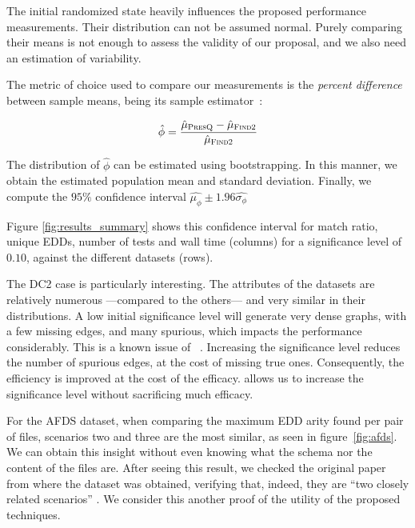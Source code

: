 The initial randomized state heavily influences the proposed performance measurements.
Their distribution can not be assumed normal.
Purely comparing their means is not enough to assess the validity of our proposal, and we also need an estimation of variability.

The metric of choice used to compare our measurements is the \emph{percent difference}
between sample means, being its sample estimator~\cite{campelo_sample_2019}:

\begin{equation}
    \label{eq:percent_difference}
    \hat{\phi} = \frac{\hat{\mu}_{\textsc{PresQ}} - \hat{\mu}_{\textsc{Find2}}}{\hat{\mu}_{\textsc{Find2}}}
\end{equation}

The distribution of
$\hat{\phi}$ can be estimated using bootstrapping.
In this manner, we obtain the estimated population mean and standard deviation. Finally,
we compute the $95\%$ confidence interval $\hat{\mu_\phi} \pm 1.96 \hat{\sigma_\phi}$

Figure \ref{fig:results_summary} shows this confidence interval for match ratio, unique \glspl{EDD},
number of tests and wall time (columns) for a significance level of $0.10$, against the
different datasets (rows).

The DC2 case is particularly interesting. The attributes of the datasets
are relatively numerous ---compared to the others--- and very similar in their distributions.
A low initial significance level will generate very dense graphs, with a few missing edges, and
many spurious, which impacts the performance considerably.
This is a known issue of \Find~\cite{koeller2006heuristic}.
Increasing the significance level reduces the number of spurious edges, at the cost of
missing true ones. Consequently, the efficiency is improved at the cost of the efficacy.
\PresQ allows us to increase the significance
level without sacrificing much efficacy.

For the \gls{AFDS} dataset, when comparing the maximum \gls{EDD} arity found per pair of files,
scenarios two and three are the most similar, as seen in figure~\ref{fig:afds}.
We can obtain this insight without even knowing what the schema nor the content of the files are.
After seeing this result, we checked the original paper from
where the dataset was obtained, verifying that, indeed, they are
``two closely related scenarios'' \cite{Gheraibia2019}.
We consider this another proof of the utility of the proposed techniques.

